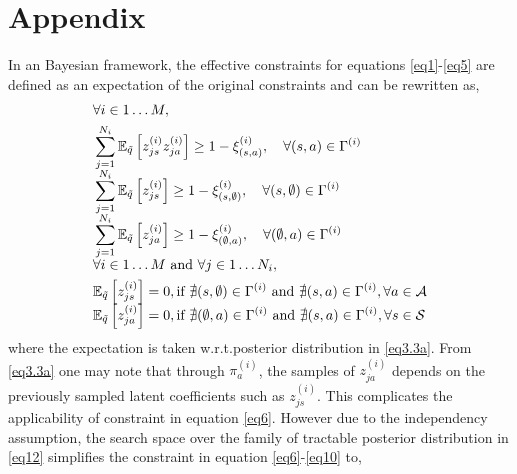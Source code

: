 \documentclass[runningheads]{llncs}
\begin{document}
\section{Appendix}
In an Bayesian framework, the effective constraints for equations \eqref{eq1}-\eqref{eq5} are defined as an expectation \cite{zhu2014bayesian,ganchev2010posterior} of the original constraints and can be rewritten as,
\begin{align} 
&\forall i \in 1\dots M, \nonumber\\
& \sum_{j=1}^{N_i} \mathbb{E}_{\tilde{q}}\left[z_{js}^{(i)} z_{ja}^{(i)}\right] \geq 1 - \xi_{(s,a)}^{(i)}, \quad \forall (s,a)\in \Gamma^{(i)} \label{eq6} \\[-0.5em]
& \sum_{j=1}^{N_i} \mathbb{E}_{\tilde{q}}\left[z_{js}^{(i)}\right] \geq 1 - \xi_{(s,\emptyset)}^{(i)}, \quad \forall (s,\emptyset)\in \Gamma^{(i)} \label{eq7}\\[-0.5em]
& \sum_{j=1}^{N_i}  \mathbb{E}_{\tilde{q}}\left[z_{ja}^{(i)}\right] \geq 1 - \xi_{(\emptyset,a)}^{(i)}, \quad \forall (\emptyset,a)\in \Gamma^{(i)} \label{eq8} \\[-0.5em]
&\forall i \in 1\dots M \mbox{ and }\forall j \in 1\dots N_i, \nonumber\\
& \mathbb{E}_{\tilde{q}}\left[z_{js}^{(i)}\right] = 0, \quad \hspace{-3.5mm}\text{if } \nexists (s,\emptyset)\in\Gamma^{(i)} \mbox{ and } \nexists (s,a) \in \Gamma^{(i)}, \forall a \in \mathcal{A}\label{eq9}\\[-0.5em]
& \mathbb{E}_{\tilde{q}}\left[z_{ja}^{(i)}\right] = 0, \quad \hspace{-3.5mm}\text{if } \nexists (\emptyset,a)\in\Gamma^{(i)} \mbox{ and } \nexists  (s,a) \in \Gamma^{(i)},  \forall s \in \mathcal{S} \label{eq10}
\vspace{-3mm}
\end{align}
where the expectation is taken w.r.t.\the posterior distribution in \eqref{eq3.3a}. From \eqref{eq3.3a} one may note that through $\pi_a^{(i)}$, the samples of $z_{ja}^{(i)}$ depends on the previously sampled latent coefficients such as $z_{js}^{(i)}$. This complicates the applicability of constraint in equation \eqref{eq6}. However due to the independency assumption, the search space over the family of tractable posterior distribution in \eqref{eq12} simplifies the constraint in equation \eqref{eq6}-\eqref{eq10} to, 
\end{document}
